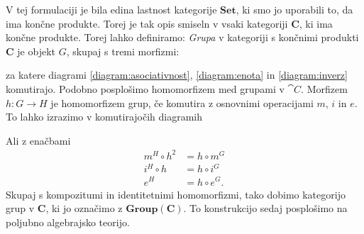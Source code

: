 \documentclass[../kategoricna_logika.tex]{subfiles}
\begin{document}
%
V tej formulaciji je bila edina lastnost kategorije $\mathbf{Set}$, ki smo jo uporabili to,
da ima končne produkte. Torej je tak opis smiseln v vsaki kategoriji $\mathbf{C}$,
ki ima končne produkte. Torej lahko definiramo:
\emph{Grupa} v kategoriji s končnimi produkti $\mathbf{C}$ je objekt
$G$, skupaj s tremi morfizmi:
\begin{center}
\end{center}
za katere diagrami \eqref{diagram:asociativnost}, \eqref{diagram:enota} in \eqref{diagram:inverz}
komutirajo.
%
Podobno posplošimo homomorfizem med grupami v $\cat{C}$. Morfizem
$h : G \to H$ je homomorfizem grup, če komutira z osnovnimi operacijami $m$, $i$ in $e$.
To lahko izrazimo v komutirajočih diagramih
%
\begin{center}
\end{center}
Ali z enačbami
\begin{align*}
m^H \circ h^2 &= h \circ m^G \\
i^H \circ h &= h \circ i^G \\
e^H &= h \circ e^G.
\end{align*}
Skupaj s kompozitumi in identitetnimi homomorfizmi, tako dobimo
kategorijo grup v $\mathbf{C}$, ki jo označimo z $\mathbf{Group}(\mathbf{C})$.
To konstrukcijo sedaj posplošimo na poljubno algebrajsko teorijo.
\end{document}
